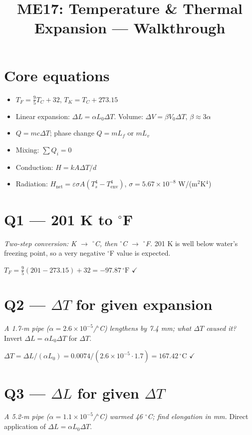 \documentclass[11pt]{article}
\title{ME17: Temperature \& Thermal Expansion --- Walkthrough}
\author{}\date{}
\newcommand{\checkmk}{\ensuremath{\checkmark}}
\begin{document}
\maketitle

\section*{Core equations}
\begin{itemize}[leftmargin=*]
\item $T_F = \tfrac95 T_C + 32$, $T_K = T_C + 273.15$
\item Linear expansion: $\Delta L = \alpha L_0\Delta T$. Volume: $\Delta V = \beta V_0\Delta T$, $\beta\approx 3\alpha$
\item $Q = mc\Delta T$; phase change $Q = mL_f$ or $mL_v$
\item Mixing: $\sum Q_i = 0$
\item Conduction: $H = kA\Delta T/d$
\item Radiation: $H_{\text{net}} = \varepsilon\sigma A(T_s^4 - T_{\text{env}}^4)$, $\sigma = 5.67\times 10^{-8}$ W/(m$^2$K$^4$)
\end{itemize}

\section*{Q1 --- 201 K to $^\circ$F}
\emph{Two-step conversion: K $\to$ $^\circ$C, then $^\circ$C $\to$ $^\circ$F.} 201 K is well below water's freezing point, so a very negative $^\circ$F value is expected.

$T_F = \tfrac95(201-273.15) + 32 = \boxed{-97.87\,^\circ\text{F}}$ \checkmk

\section*{Q2 --- $\Delta T$ for given expansion}
\emph{A 1.7-m pipe ($\alpha=2.6\times10^{-5}$/$^\circ$C) lengthens by 7.4 mm; what $\Delta T$ caused it?} Invert $\Delta L=\alpha L_0\Delta T$ for $\Delta T$.

$\Delta T = \Delta L/(\alpha L_0) = 0.0074/(2.6\times10^{-5}\cdot 1.7) = \boxed{167.42\,^\circ\text{C}}$ \checkmk

\section*{Q3 --- $\Delta L$ for given $\Delta T$}
\emph{A 5.2-m pipe ($\alpha=1.1\times10^{-5}$/$^\circ$C) warmed 46 $^\circ$C; find elongation in mm.} Direct application of $\Delta L=\alpha L_0\Delta T$.
\end{document}

